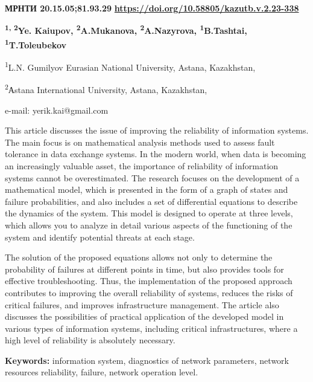\newpage
{}
{\bfseries МРНТИ 20.15.05;81.93.29}
\hfill {\bfseries \href{https://doi.org/10.58805/kazutb.v.2.23-338}{https://doi.org/10.58805/kazutb.v.2.23-338}}


\begin{center}
{\bfseries \textsuperscript{1, 2}Ye. Kaiupov\envelope,
\textsuperscript{2}A.Mukanova, \textsuperscript{2}A.Nazyrova,
\textsuperscript{1}B.Tashtai, \textsuperscript{1}T.Toleubekov}

\textsuperscript{1}L.N. Gumilyov Eurasian National University, Astana,
Kazakhstan,

\textsuperscript{2}Аstana International University, Astana, Kazakhstan,

e-mail: yerik.kai@gmail.com
\end{center}

This article discusses the issue of improving the reliability of
information systems. The main focus is on mathematical analysis methods
used to assess fault tolerance in data exchange systems. In the modern
world, when data is becoming an increasingly valuable asset, the
importance of reliability of information systems cannot be
overestimated. The research focuses on the development of a mathematical
model, which is presented in the form of a graph of states and failure
probabilities, and also includes a set of differential equations to
describe the dynamics of the system. This model is designed to operate
at three levels, which allows you to analyze in detail various aspects
of the functioning of the system and identify potential threats at each
stage.

The solution of the proposed equations allows not only to determine the
probability of failures at different points in time, but also provides
tools for effective troubleshooting. Thus, the implementation of the
proposed approach contributes to improving the overall reliability of
systems, reduces the risks of critical failures, and improves
infrastructure management. The article also discusses the possibilities
of practical application of the developed model in various types of
information systems, including critical infrastructures, where a high
level of reliability is absolutely necessary.

{\bfseries Keywords:} information system, diagnostics of network
parameters, network resources reliability, failure, network operation
level.

